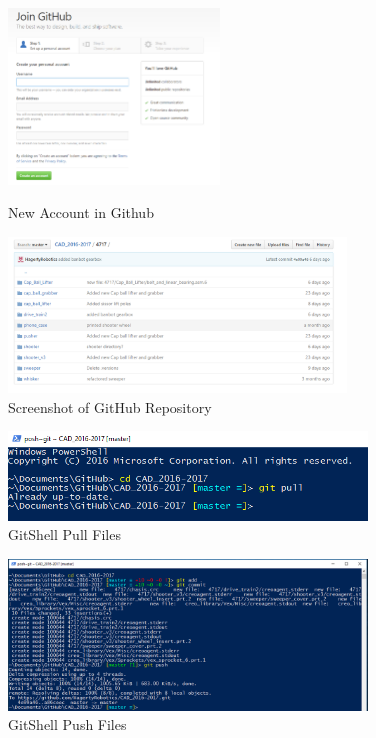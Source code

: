 \begin{figure}[ht]
\centering
\begin{minipage}[b]{.50\textwidth}
  \centering
  \includegraphics[width=0.5\textwidth]{Meetings/September/09-23-21/githubnewacc.png}
  \caption{New Account in Github}
  \label{fig:pic1}
\end{minipage}%
\hfill%
\begin{minipage}[b]{.50\textwidth}
  \centering
  \includegraphics[width=0.8\textwidth]{Meetings/September/09-23-21/githubrepository.png}
  \caption{Screenshot of GitHub Repository}
  \label{fig:pic2}
\end{minipage}
\end{figure}




\begin{figure}
\centering
\includegraphics[width=0.85\textwidth, angle=0]{Meetings/September/09-23-21/gitshellpull.png}
\caption{GitShell Pull Files}
\label{fig:pic3}
\end{figure}


\begin{figure}
\centering
\includegraphics[width=0.85\textwidth, angle=0]{Meetings/September/09-23-21/gitshellpush.png}
\caption{GitShell Push Files}
\label{fig:pic4}
\end{figure}


